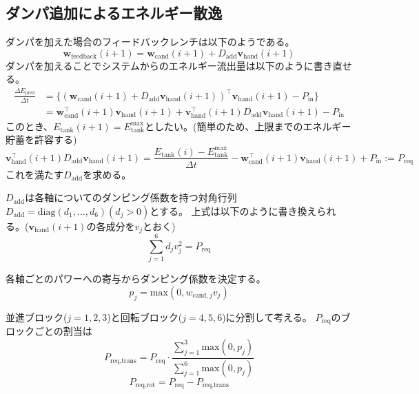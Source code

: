 \documentclass[uplatex]{jsarticle}
\begin{document}
\subsection{ダンパ追加によるエネルギー散逸}
ダンパを加えた場合のフィードバックレンチは以下のようである。
\begin{equation}
  \bm{w}_{\text{feedback}}(i+1) = \bm{w}_{\text{cand}}(i+1) + D_{\text{add}} \bm{v}_{\text{hand}}(i+1)
\end{equation}
ダンパを加えることでシステムからのエネルギー流出量は以下のように書き直せる。
\begin{equation}
\begin{split}
  \frac {\Delta E_{\text{pred}}}{\Delta t} &= \{(\bm{w}_{\text{cand}}(i+1) + D_{\text{add}} \bm{v}_{\text{hand}}(i+1))^\top \bm{v}_{\text{hand}}(i+1) - P_{\text{in}}\} \\
  &= \bm{w}_{\text{cand}}^\top(i+1) \bm{v}_{\text{hand}}(i+1) + \bm{v}_{\text{hand}}^\top(i+1) D_{\text{add}} \bm{v}_{\text{hand}}(i+1) - P_{\text{in}}
\end{split}
\end{equation}
このとき、$E_{\text{tank}}(i+1) = E_{\text{tank}}^{\text{max}}$としたい。(簡単のため、上限までのエネルギー貯蓄を許容する)
\begin{equation}
  \bm{v}_{\text{hand}}^\top(i+1) D_{\text{add}} \bm{v}_{\text{hand}}(i+1) = \frac{E_{\text{tank}}(i) - E_{\text{tank}}^{\text{max}}}{\Delta t} - \bm{w}_{\text{cand}}^\top(i+1) \bm{v}_{\text{hand}}(i+1) + P_{\text{in}} := P_{\text{req}}
\end{equation}
これを満たす$D_{\text{add}}$を求める。

$D_{\text{add}}$は各軸についてのダンピング係数を持つ対角行列$D_{\text{add}} = \text{diag}(d_1, \ldots, d_6) (d_j > 0)$とする。
上式は以下のように書き換えられる。($\bm{v}_{\text{hand}}(i+1)$の各成分を$v_j$とおく)
\begin{equation}
  \sum_{j=1}^{6} d_j v_j^2 = P_{\text{req}}
\end{equation}

各軸ごとのパワーへの寄与からダンピング係数を決定する。
\begin{equation}
  p_j = \text{max}(0, w_{\text{cand},j} v_j)
\end{equation}

並進ブロック($j=1,2,3$)と回転ブロック($j=4,5,6$)に分割して考える。
$P_{\text{req}}$のブロックごとの割当は
\begin{equation}
  P_{\text{req,trans}} = P_{\text{req}} \cdot \frac{\sum_{j=1}^{3} \text{max}(0,p_j)}{\sum_{j=1}^{6} \text{max}(0,p_j)}
\end{equation}
\begin{equation}
  P_{\text{req,rot}} = P_{\text{req}} - P_{\text{req,trans}}
\end{equation}
\end{document}
